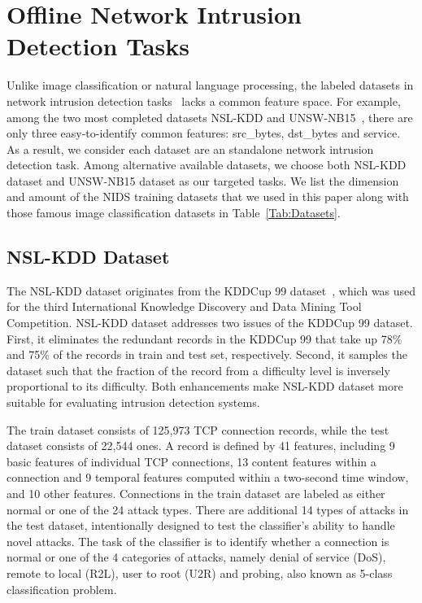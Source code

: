 \section{Offline Network Intrusion Detection Tasks}
Unlike image classification or natural language processing,
the labeled datasets in network intrusion detection tasks~\cite{KDDCup, DARPA, UNSW1, UNSW, NSL-KDD} lacks a common feature space.
For example, among the two most completed datasets NSL-KDD\cite{NSL-KDD} and UNSW-NB15~\cite{UNSW},
there are only three easy-to-identify common features: src\_bytes, dst\_bytes and service.
As a result, we consider each dataset are an standalone network intrusion detection task.
Among alternative available datasets,
we choose both NSL-KDD dataset and UNSW-NB15 dataset as our targeted tasks.
We list the dimension and amount of the NIDS training datasets that we used in this paper along with those famous image classification datasets in Table~\ref{Tab:Datasets}.

\subsection{NSL-KDD Dataset}
The NSL-KDD dataset originates from the KDDCup 99 dataset~\cite{KDDCup},
which was used for the third International Knowledge Discovery and Data Mining Tool Competition.
NSL-KDD dataset addresses two issues of the KDDCup 99 dataset.
First, it eliminates the redundant records in the KDDCup 99 that take up
78\% and 75\% of the records in train and test set, respectively.
Second, it samples the dataset such that the fraction of the record from a difficulty level
is inversely proportional to its difficulty.
Both enhancements make NSL-KDD dataset more suitable for
evaluating intrusion detection systems.

The train dataset consists of 125,973 TCP connection records, while the test dataset
consists of 22,544 ones.
A record is defined by 41 features, including 9 basic features of individual
TCP connections, 13 content features within a connection and 9 temporal features computed
within a two-second time window, and 10 other features.
Connections in the train dataset are labeled as either normal or one of the 24 attack
types.
There are additional 14 types of attacks in the test dataset, intentionally designed to
test the classifier's ability to handle novel attacks.
The task of the classifier is to identify whether a connection is normal or one of the
4 categories of attacks, namely denial of service (DoS), remote to local (R2L), user to
root (U2R) and probing, also known as 5-class classification problem.

